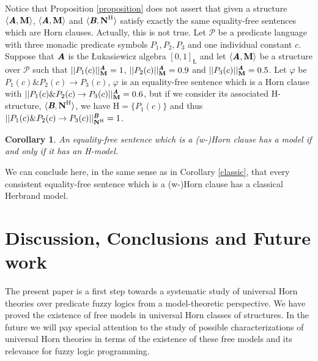 \documentclass{IOS-Book-Article}
\newtheorem{corollary}{Corollary}
\begin{document}
{\bigskip


Notice that Proposition \ref{proposition} does not assert that given a structure $\langle\emph{\textbf{A}},\textbf{M}\rangle$,  $\langle\emph{\textbf{A}},\textbf{M}\rangle$ and $\langle\emph{\textbf{B}},\textbf{N}^{\text{H}}\rangle$ satisfy exactly the same equality-free sentences which are Horn clauses. Actually, this is not true. Let $\mathcal{P}$ be a predicate language with three monadic predicate symbols $P_1,P_2,P_3$ and one individual constant $c$.  Suppose that $\emph{\textbf{A}}$ is the \L ukasiewicz algebra $[0,1]_{\text{\L}}$ and let  $\langle\emph{\textbf{A}},\textbf{M}\rangle$ be a structure over $\mathcal{P}$ such that $||P_1(c)||^{\emph{\textbf{A}}}_{\textbf{M}}=1$, $||P_2(c)||^{\emph{\textbf{A}}}_{\textbf{M}}=0.9$ and $||P_3(c)||^{\emph{\textbf{A}}}_{\textbf{M}}=0.5$. Let $\varphi$ be $P_1(c)\& P_2(c)\rightarrow P_3(c)$, $\varphi$ is an equality-free sentence which is a Horn clause with $||P_1(c)\& P_2(c)\rightarrow P_3(c)||^{\emph{\textbf{A}}}_{\textbf{M}}=0.6$, but if we consider its associated H-structure, $\langle\emph{\textbf{B}},\textbf{N}^{\text{H}}\rangle$, we have H$=\{P_1(c)\}$ and thus $||P_1(c)\& P_2(c)\rightarrow P_3(c)||^{\emph{\textbf{B}}}_{\textbf{N}^{\text{H}}}=1$.



\begin{corollary} \label{corollary H-model} An equality-free sentence which is a (w-)Horn clause has a model if and only if it has an \emph{H}-model. 
\end{corollary}

We can conclude here, in the same sense as in Corollary \ref{classic}, that every consistent equality-free sentence which is a (w-)Horn clause has a classical Herbrand model.



\section{Discussion, Conclusions and Future work}  
\label{Conclusions}

The present paper is a first step towards a systematic study of universal Horn theories over predicate fuzzy logics from a model-theoretic perspective. We have proved the existence of free models in universal Horn classes of structures. In the future we will pay special attention to the study of possible characterizations of universal Horn theories in terms of the existence of these free models and its relevance for fuzzy logic programming. 
    
}
\end{document}
